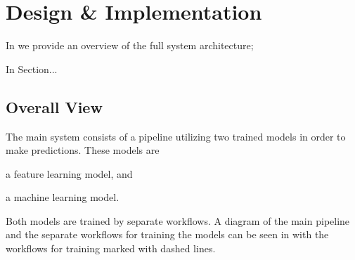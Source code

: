 \chapter{Design \& Implementation}\label{chap:design}

\begin{chapterorganization}
  \item In  we provide an overview of the full system architecture;
  \item In Section...
\end{chapterorganization}

\section{Overall View}
The main system consists of a pipeline utilizing two trained models in order to make predictions. These models are
\begin{enumerate*}[label=(\roman*)]
  \item a feature learning model, and
  \item a machine learning model.
\end{enumerate*}
Both models are trained by separate workflows. A diagram of the main pipeline and the separate workflows for training the models can be seen in  with the workflows for training marked with dashed lines.

